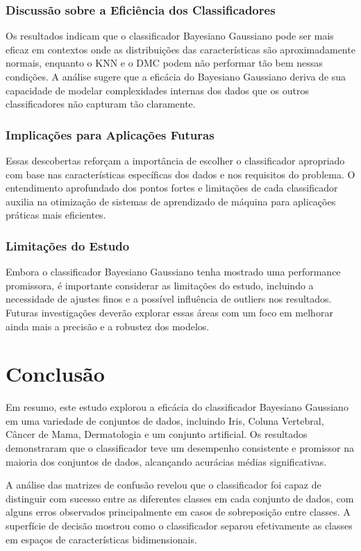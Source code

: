 \documentclass[12pt, a4paper]{report}
\begin{document}
\subsection{Discussão sobre a Eficiência dos Classificadores}
Os resultados indicam que o classificador Bayesiano Gaussiano pode ser mais eficaz em contextos onde as distribuições das características são aproximadamente normais, enquanto o KNN e o DMC podem não performar tão bem nessas condições. A análise sugere que a eficácia do Bayesiano Gaussiano deriva de sua capacidade de modelar complexidades internas dos dados que os outros classificadores não capturam tão claramente.

\subsection{Implicações para Aplicações Futuras}
Essas descobertas reforçam a importância de escolher o classificador apropriado com base nas características específicas dos dados e nos requisitos do problema. O entendimento aprofundado dos pontos fortes e limitações de cada classificador auxilia na otimização de sistemas de aprendizado de máquina para aplicações práticas mais eficientes.

\subsection{Limitações do Estudo}
Embora o classificador Bayesiano Gaussiano tenha mostrado uma performance promissora, é importante considerar as limitações do estudo, incluindo a necessidade de ajustes finos e a possível influência de outliers nos resultados. Futuras investigações deverão explorar essas áreas com um foco em melhorar ainda mais a precisão e a robustez dos modelos.


\chapter{Conclusão}

Em resumo, este estudo explorou a eficácia do classificador Bayesiano Gaussiano em uma variedade de conjuntos de dados, incluindo Iris, Coluna Vertebral, Câncer de Mama, Dermatologia e um conjunto artificial. Os resultados demonstraram que o classificador teve um desempenho consistente e promissor na maioria dos conjuntos de dados, alcançando acurácias médias significativas.

A análise das matrizes de confusão revelou que o classificador foi capaz de distinguir com sucesso entre as diferentes classes em cada conjunto de dados, com alguns erros observados principalmente em casos de sobreposição entre classes. A superfície de decisão mostrou como o classificador separou efetivamente as classes em espaços de características bidimensionais.
\end{document}
